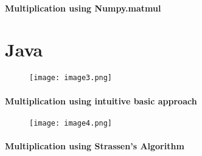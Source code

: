 \documentclass{article}
\begin{document}
\paragraph{Multiplication using Numpy.matmul}



\hfill 
\newline
\hfill 
\newline


\section{Java}

\hfill 
\newline
\begin{figure}[H]
    \centering
    \texttt{[image: image3.png]}
\end{figure}
\paragraph{Multiplication using intuitive basic approach}

\hfill 
\newline
\begin{figure}[H]
    \centering
    \texttt{[image: image4.png]}
\end{figure}
\paragraph{Multiplication using Strassen's Algorithm}
\end{document}
